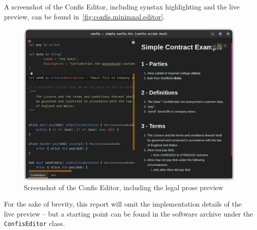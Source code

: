 A screenshot of the Confis Editor, including synstax highlighting and the live preview, can be found in~\autoref{fig:confis.minimnal.editor}.

\begin{figure}[h]
    \centering
    \includegraphics[width=\textwidth]{figures/simple.confis.editor}
    \caption{Screenshot of the Confis Editor, including the legal prose preview}
    \label{fig:confis.minimnal.editor}
\end{figure}



For the sake of brevity, this report will omit the implementation details of the live preview -- but a starting point can be found in the software archive under the \texttt{ConfisEditor} class.

